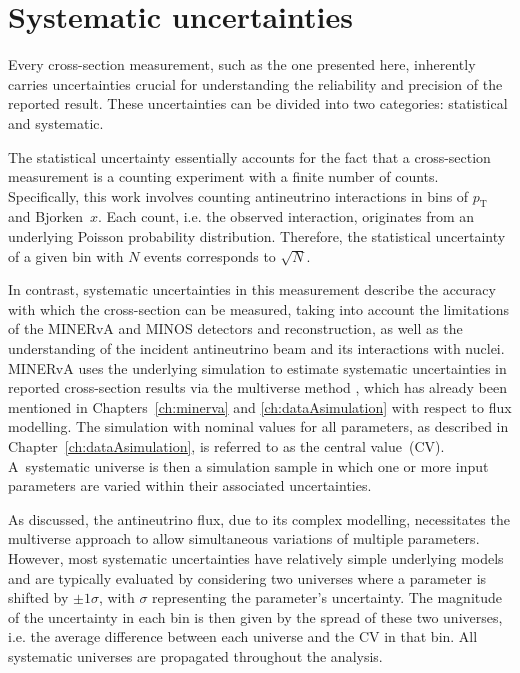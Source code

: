 \chapter{Systematic uncertainties}

\label{ch:systematics}

Every cross-section measurement, such as the one presented here, inherently carries uncertainties crucial for understanding the reliability and precision of the reported result. These uncertainties can be divided into two categories: statistical and systematic.

The statistical uncertainty essentially accounts for the fact that a cross-section measurement is a counting experiment with a finite number of counts. Specifically, this work involves counting antineutrino interactions in bins of $p_{\text{T}}$ and Bjorken~$x$. Each count, i.e. the observed interaction, originates from an underlying Poisson probability distribution. Therefore, the statistical uncertainty of a given bin with $N$ events corresponds to $\sqrt{N}$. 

In contrast, systematic uncertainties in this measurement describe the accuracy with which the cross-section can be measured, taking into account the limitations of the MINERvA and MINOS detectors and reconstruction, as well as the understanding of the incident antineutrino beam and its interactions with nuclei. MINERvA uses the underlying simulation to estimate systematic uncertainties in reported cross-section results via the multiverse method \cite{MAT_Messerly_2021}, which has already been mentioned in Chapters~\ref{ch:minerva} and \ref{ch:dataAsimulation} with respect to flux modelling. The simulation with nominal values for all parameters, as described in Chapter~\ref{ch:dataAsimulation}, is referred to as the central value~(CV). A~systematic universe is then a simulation sample in which one or more input parameters are varied within their associated uncertainties. 

As discussed, the antineutrino flux, due to its complex modelling, necessitates the multiverse approach to allow simultaneous variations of multiple parameters. However, most systematic uncertainties have relatively simple underlying models and are typically evaluated by considering two universes where a parameter is shifted by $\pm 1 \sigma$, with $\sigma$ representing the parameter's uncertainty. The magnitude of the uncertainty in each bin is then given by the spread of these two universes, i.e. the average difference between each universe and the CV in that bin. All systematic universes are propagated throughout the analysis.

